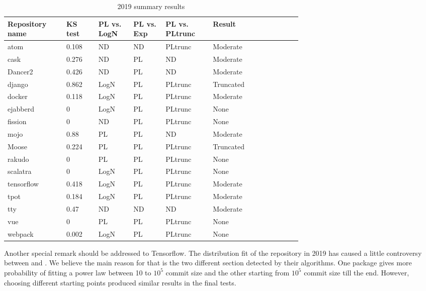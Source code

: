 \documentclass[conference]{IEEEtran}
\begin{document}
\begin{table}[h!tbp]
  \caption{2019 summary results}
  \begin{center}
    \begin{tabular}{| p{0.12\linewidth} | p{0.08\linewidth} |
        p{0.08\linewidth} | p{0.08\linewidth} | p{0.1\linewidth}
        |p{0.13\linewidth} | p{0.09\linewidth} |}
      \hline
      Repository name & KS test & PL vs. LogN & PL vs. Exp & PL vs. PLtrunc & Result \\ 
      \hline
      atom &0.108 &ND &ND &PLtrunc & Moderate\\
      cask &0.276 &ND &PL &ND & Moderate \\
      Dancer2 &0.426 &ND &PL &ND & Moderate \\
      django &0.862 &LogN &PL &PLtrunc &Truncated \\
      docker &0.118 &LogN &PL &PLtrunc & Moderate \\
      ejabberd &0 &LogN &PL &PLtrunc & None\\
      fission &0 &ND &PL &PLtrunc & None \\
      mojo &0.88 &PL &PL &ND &Moderate \\
      Moose &0.224 &PL &PL &PLtrunc &Truncated \\
      rakudo &0 &PL &PL &PLtrunc & None \\
      scalatra &0 &LogN &PL &PLtrunc & None \\
      tensorflow &0.418 &LogN &PL &PLtrunc & Moderate \\
      tpot &0.184 &LogN &PL &PLtrunc & Moderate \\
      tty &0.47 &ND &ND &ND & Moderate \\
      vue &0 &PL &PL &PLtrunc & None \\
      webpack &0.002 &LogN &PL &PLtrunc & None\\
      \hline
    \end{tabular}
  \end{center}
  \label{tab:2019tests}
\end{table}
%
Another special remark should be addressed to Tensorflow. The
distribution fit of the repository in 2019 has caused a little
controversy between \cite{alstott2014powerlaw} and
\cite{gillespie2015power}. We believe the main reason for that is the
two different section detected by their algorithms. One package gives
more probability of fitting a power law between 10 to $10^5$ commit
size and the other starting from $10^5$ commit size till the
end. However, choosing different starting points produced similar
results in the final
tests. %
\end{document}
